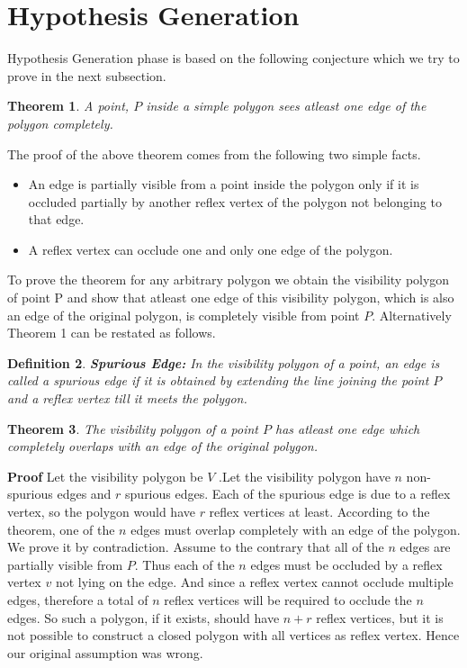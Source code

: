 \documentclass[a4paper,10pt]{article}
\newtheorem{theorem}{Theorem}
\newtheorem{definition}[theorem]{Definition}
\begin{document}
\newpage
\section{Hypothesis Generation}
Hypothesis Generation phase is based on the following conjecture which we try to prove in the next subsection.

\begin{theorem}
 A point, $P$ inside a simple polygon sees atleast one edge of the polygon completely.
\end{theorem}
The proof of the above theorem comes from the following two simple facts.
\begin{itemize}
 \item An edge is partially visible from a point inside the polygon only if it is occluded partially by another reflex vertex of the polygon
not belonging to that edge.
\item A reflex vertex can occlude one and only one edge of the polygon.
\end{itemize}

To prove the theorem for any arbitrary polygon we obtain the visibility polygon of point P and show that atleast one edge of this
visibility polygon, which is also an edge of the original polygon, is completely visible from point $P$. Alternatively Theorem 1 can be
 restated as follows.

\begin{definition}
 {\bf Spurious Edge:} In the visibility polygon of a point, an edge is called a spurious edge if it is obtained by extending the line
 joining the point $P$ and a reflex vertex till it meets the polygon.
\end{definition}


\begin{theorem}
 The visibility polygon of a point $P$ has atleast one edge which completely overlaps with an edge of the original polygon.
\end{theorem}
{\bf Proof} Let the visibility polygon be $V$ .Let the visibility polygon have $n$ non-spurious edges and $r$ spurious edges.
Each of the spurious edge is due to a reflex vertex, so the polygon would have $r$ reflex vertices at least.
 According to the theorem, one of the $n$ edges must overlap completely with an edge of the polygon.
We prove it by contradiction. Assume to the contrary that all of the $n$ edges are partially visible from $P$. Thus each of the $n$
edges must be occluded by a reflex vertex $v$ not lying on the edge. And since a reflex vertex cannot occlude multiple edges, therefore
 a total of $n$ reflex vertices will be required to occlude the $n$ edges.
So such a polygon, if it exists, should have $n+r$ reflex vertices, but it is not possible to construct a closed polygon with all
 vertices as reflex vertex.
Hence our original assumption was wrong.
\end{document}
